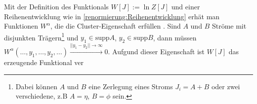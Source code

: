     Mit der Definition des Funktionals $W[J] := \ln Z[J]$
    und einer Reihenentwicklung wie in \eqref{renormierung:Reihenentwicklung} 
    erhät man Funktionen $W^\alpha$, die die Cluster-Eigenschaft erfüllen
    \cite{Zinn}. Sind $A$ und $B$ Ströme mit disjunkten Trägern\footnote{Dabei 
    können $A$ und $B$ eine Zerlegung eines Stroms $J_i=A+B$ oder zwei 
    verschiedene, z.B $A=\eta$, $B=\phi$ sein.} und $y_1\in\text{supp}A$, 
    $y_2\in\text{supp}B$, dann müssen $W^\alpha(\ldots,y_1,\ldots,y_2,\ldots) 
    \overset{||y_1-y_2||\to \infty}{\longrightarrow} 0 $. Aufgund dieser 
    Eigenschaft ist $W[J]$ das erzeugende Funktional ver




